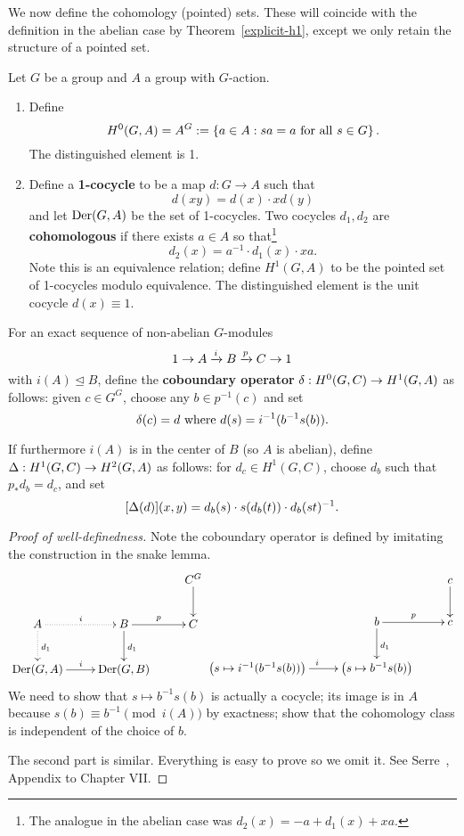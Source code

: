We now define the cohomology (pointed) sets. These will coincide with the definition in the abelian case by Theorem~\ref{explicit-h1}, except we only retain the structure of a pointed set.
\begin{df}
Let $G$ be a group and $A$ a group with $G$-action.
\begin{enumerate}
\item
Define
\[
H^0(G,A)=A^G:=\left\{{a\in A}:{sa=a\text{ for all }s\in G}\right\}.
\]
The distinguished element is 1.
\item
Define a \textbf{1-cocycle} to be a map $d:G\to A$ such that 
\[
d(xy)=d(x)\cdot xd(y)
\]
and let $\operatorname{Der}(G,A)$ be the set of 1-cocycles.
Two cocycles $d_1,d_2$ are \textbf{cohomologous} if there exists $a\in A$ so that\footnote{The analogue in the abelian case was $d_2(x)=-a+d_1(x)+xa$.}
\[
d_2(x)=a^{-1}\cdot d_1(x)\cdot xa.
\]
Note this is an equivalence relation; define $H^1(G,A)$ to be the pointed set of 1-cocycles modulo equivalence. The distinguished element is the unit cocycle $d(x)\equiv 1$.
\end{enumerate}
For an exact sequence of non-abelian $G$-modules
\[
1\to A \xrightarrow{i} B \xrightarrow{p}C\to 1
\]
with $i(A)\trianglelefteq B$, define the \textbf{coboundary operator} $\delta:H^0(G,C)\to H^1(G,A)$ as follows: given $c\in G^G$, choose any $b\in p^{-1}(c)$ and set
\[
\delta (c)=d\text{ where } d(s)=i^{-1}(b^{-1} s(b)).
\]

If furthermore $i(A)$ is in the center of $B$ (so $A$ is abelian), define $\Delta:H^1(G,C)\to H^2(G,A)$ as follows: for $d_c\in H^1(G,C)$, choose $d_b$ such that $p_*d_b=d_c$, and set
\[
[\Delta(d)](x,y)=d_b(s)\cdot s(d_b(t))\cdot d_b(st)^{-1}.
\]
\end{df}
\begin{proof}[Proof of well-definedness]
Note the coboundary operator is defined by imitating the construction in the snake lemma.
\[
\xymatrix{
&& C^G\ar[d]\\
A\ar@{.>}[r]^i \ar@{.>}[d]^{d_1}&  B\ar[r]^{p} \ar[d]^{d_1}
& C\\
\Der(G, A)\ar[r]^i&\Der(G,B)\\
}
\xymatrix{
&& c\ar[d]\\
& b \ar[r]^{p} \ar[d]^{d_1}
& c\\
\pa{s\mapsto i^{-1}(b^{-1}s(b))}\ar[r]^i&\pa{s\mapsto b^{-1}s(b)}\\
}
\]
We need to show that $s\mapsto b^{-1}s(b)$ is actually a cocycle; its image is in $A$ because $s(b)\equiv b^{-1} \pmod{i(A)}$ by exactness; show that the cohomology class is independent of the choice of $b$.

The second part is similar. Everything is easy to prove so we omit it. See Serre~\cite{Se79}, Appendix to Chapter VII.
\end{proof}
